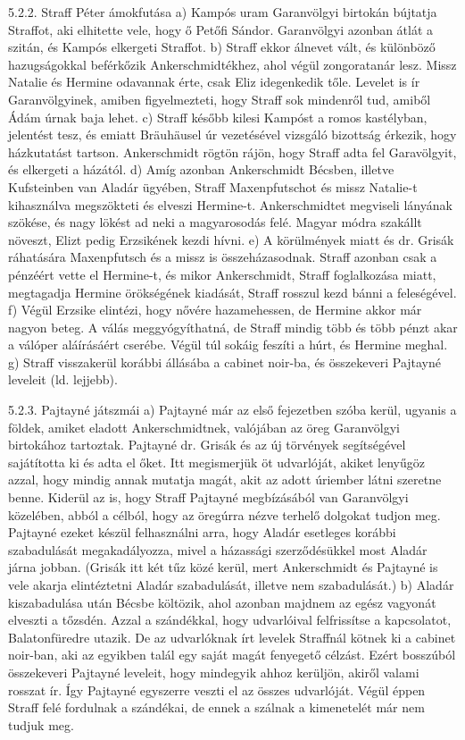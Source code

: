 \documentclass[a4paper,12pt]{thesis-ekf}
\begin{document}
    5.2.2. Straff Péter ámokfutása
    a) Kampós uram Garanvölgyi birtokán bújtatja Straffot, aki elhitette vele, hogy ő Petőfi Sándor. Garanvölgyi azonban átlát a szitán, és Kampós elkergeti Straffot.
    b) Straff ekkor álnevet vált, és különböző hazugságokkal beférkőzik Ankerschmidtékhez, ahol végül zongoratanár lesz. Missz Natalie és Hermine odavannak érte, csak Eliz idegenkedik tőle. Levelet is ír Garanvölgyinek, amiben figyelmezteti, hogy Straff sok mindenről tud, amiből Ádám úrnak baja lehet.
    c) Straff később kilesi Kampóst a romos kastélyban, jelentést tesz, és emiatt Bräuhäusel úr vezetésével vizsgáló bizottság érkezik, hogy házkutatást tartson. Ankerschmidt rögtön rájön, hogy Straff adta fel Garavölgyit, és elkergeti a házától.
    d) Amíg azonban Ankerschmidt Bécsben, illetve Kufsteinben van Aladár ügyében, Straff Maxenpfutschot és missz Natalie-t kihasználva megszökteti és elveszi Hermine-t. Ankerschmidtet megviseli lányának szökése, és nagy lökést ad neki a magyarosodás felé. Magyar módra szakállt növeszt, Elizt pedig Erzsikének kezdi hívni.
    e) A körülmények miatt és dr. Grisák ráhatására Maxenpfutsch és a missz is összeházasodnak. Straff azonban csak a pénzéért vette el Hermine-t, és mikor Ankerschmidt, Straff foglalkozása miatt, megtagadja Hermine örökségének kiadását, Straff rosszul kezd bánni a feleségével.
    f) Végül Erzsike elintézi, hogy nővére hazamehessen, de Hermine akkor már nagyon beteg. A válás meggyógyíthatná, de Straff mindig több és több pénzt akar a válóper aláírásáért cserébe. Végül túl sokáig feszíti a húrt, és Hermine meghal.
    g) Straff visszakerül korábbi állásába a cabinet noir-ba, és összekeveri Pajtayné leveleit (ld. lejjebb).

    5.2.3. Pajtayné játszmái
    a) Pajtayné már az első fejezetben szóba kerül, ugyanis a földek, amiket eladott Ankerschmidtnek, valójában az öreg Garanvölgyi birtokához tartoztak. Pajtayné dr. Grisák és az új törvények segítségével sajátította ki és adta el őket. Itt megismerjük öt udvarlóját, akiket lenyűgöz azzal, hogy mindig annak mutatja magát, akit az adott úriember látni szeretne benne. Kiderül az is, hogy Straff Pajtayné megbízásából van Garanvölgyi közelében, abból a célból, hogy az öregúrra nézve terhelő dolgokat tudjon meg. Pajtayné ezeket készül felhasználni arra, hogy Aladár esetleges korábbi szabadulását megakadályozza, mivel a házassági szerződésükkel most Aladár járna jobban. (Grisák itt két tűz közé kerül, mert Ankerschmidt és Pajtayné is vele akarja elintéztetni Aladár szabadulását, illetve nem szabadulását.)
    b) Aladár kiszabadulása után Bécsbe költözik, ahol azonban majdnem az egész vagyonát elveszti a tőzsdén. Azzal a szándékkal, hogy udvarlóival felfrissítse a kapcsolatot, Balatonfüredre utazik. De az udvarlóknak írt levelek Straffnál kötnek ki a cabinet noir-ban, aki az egyikben talál egy saját magát fenyegető célzást. Ezért bosszúból összekeveri Pajtayné leveleit, hogy mindegyik ahhoz kerüljön, akiről valami rosszat ír. Így Pajtayné egyszerre veszti el az összes udvarlóját. Végül éppen Straff felé fordulnak a szándékai, de ennek a szálnak a kimenetelét már nem tudjuk meg.
\end{document}
